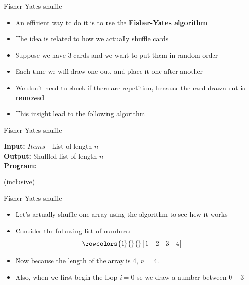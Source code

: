 \documentclass[10pt,xcolor={table,dvipsnames},t]{beamer}
\begin{document}
\begin{frame}{Fisher-Yates shuffle}
  \begin{itemize}
    \item An efficient way to do it is to use the \textbf{Fisher-Yates algorithm}
    \item The idea is related to how we actually shuffle cards
    \item Suppose we have $3$ cards and we want to put them in random order 
    \item Each time we will draw one out, and place it one after another 
    \item We don't need to check if there are repetition, because the card drawn out is \textbf{removed}
    \item This insight lead to the following algorithm
  \end{itemize}
\end{frame}

\begin{frame}{Fisher-Yates shuffle}
  \begin{algorithm}[H]
    \caption{Fisher-Yates shuffle}\label{alg:fisher_yates}
    \begin{flushleft}
      \textbf{Input:} $Items$ - List of length $n$\\
      \textbf{Output:} Shuffled list of length $n$\\
      \textbf{Program:} 
    \end{flushleft}
    \begin{algorithmic}
         (inclusive)
      \EndFor
    \end{algorithmic}
  \end{algorithm}
\end{frame}

\begin{frame}{Fisher-Yates shuffle}
  \begin{itemize}
    \item Let's actually shuffle one array using the algorithm to see how it works
    \item Consider the following list of numbers:
    \begin{align*}
      \rowcolors{1}{}{}
      \begin{bmatrix}
        1 & 2 & 3 & 4
      \end{bmatrix}
    \end{align*}
    \item Now because the length of the array is 4, $n = 4$. 
    \item Also, when we first begin the loop $i=0$ so we draw a number between $0-3$
    
  \end{itemize}  
\end{frame}
\end{document}
